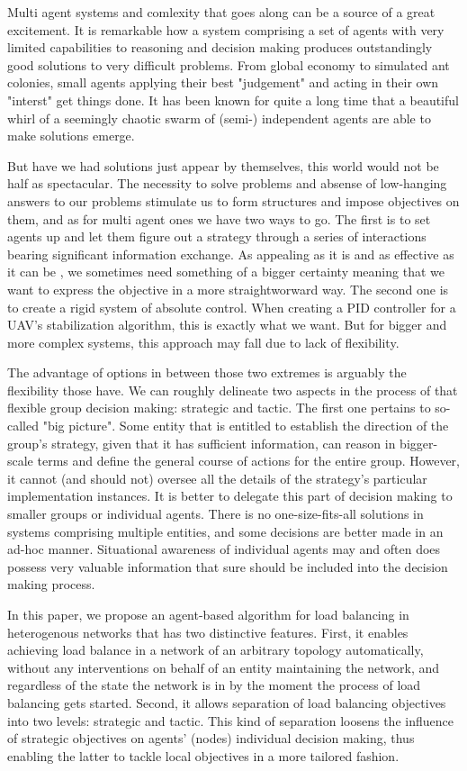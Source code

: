 Multi agent systems and comlexity that goes along can be a source of a great excitement.
It is remarkable how a system comprising a set of agents with very limited capabilities to reasoning and decision making produces outstandingly good solutions to very difficult problems.
From global economy to simulated ant colonies, small agents applying their best "judgement" and acting in their own "interst" get things done.
It has been known for quite a long time that a beautiful whirl of a seemingly chaotic swarm of (semi-) independent agents are able to make solutions emerge.

But have we had solutions just appear by themselves, this world would not be half as spectacular.
The necessity to solve problems and absense of low-hanging answers to our problems stimulate us to form structures and impose objectives on them, and as for multi agent ones we have two ways to go.
The first is to set agents up and let them figure out a strategy through a series of interactions bearing significant information exchange.
As appealing as it is and as effective as it can be \cite{dorigo-2006}, we sometimes need something of a bigger certainty meaning that we want to express the objective in a more straightworward way.
The second one is to create a rigid system of absolute control.
When creating a PID controller for a UAV's stabilization algorithm, this is exactly what we want.
But for bigger and more complex systems, this approach may fall due to lack of flexibility.

The advantage of options in between those two extremes is arguably the flexibility those have. We can roughly delineate two
aspects in the process of that flexible group decision making: strategic and tactic. The first one pertains to
so-called "big picture". Some entity that is entitled to establish the direction of the group's strategy, given that it
has sufficient information, can reason in bigger-scale terms and define the general course of actions for the entire
group. However, it cannot (and should not) oversee all the details of the strategy's particular implementation
instances. It is better to delegate this part of decision making to smaller groups or individual agents. There is no
one-size-fits-all solutions in systems comprising multiple entities, and some decisions are better made in an ad-hoc
manner.
Situational awareness \cite{endsley-1995} of individual agents may and often does possess very valuable information that
sure should be included into the decision making process.

In this paper, we propose an agent-based algorithm for load balancing in heterogenous networks that has two distinctive features.
First, it enables achieving load balance in a network of an arbitrary topology automatically, without any interventions on behalf of an entity maintaining the network, and regardless of the state the network is in by the moment the process of load balancing gets started.
Second, it allows separation of load balancing objectives into two levels: strategic and tactic.
This kind of separation loosens the influence of strategic objectives on  agents' (nodes) individual decision making, thus enabling the latter to tackle local objectives in a more tailored fashion.


